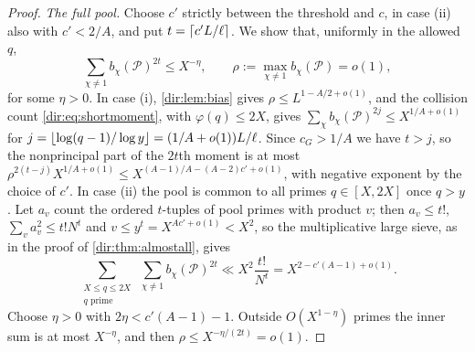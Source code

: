 \begin{proof}
\emph{The full pool.} Choose $c'$ strictly between the threshold and $c$, in case (ii) also with
$c'<2/A$, and put $t=\lceil c'L/\ell\rceil$. We show that, uniformly in the allowed $q$,
\begin{equation}\label{dir:eq:typicalmoment}
 \sum_{\chi\ne1}b_\chi(\mathcal P)^{2t}\le X^{-\eta},\qquad\rho:=\max_{\chi\ne1}b_\chi(\mathcal P)=o(1),
\end{equation}
for some $\eta>0$. In case (i), \cref{dir:lem:bias} gives $\rho\le L^{1-A/2+o(1)}$, and the collision count
\eqref{dir:eq:shortmoment}, with $\varphi(q)\le2X$, gives $\sum_\chi b_\chi(\mathcal P)^{2j}\le X^{1/A+o(1)}$
for $j=\lfloor\log(q-1)/\log y\rfloor=(1/A+o(1))L/\ell$. Since $c_G>1/A$ we have $t>j$, so the nonprincipal part
of the $2t$th moment is at most $\rho^{2(t-j)}X^{1/A+o(1)}\le X^{(A-1)/A-(A-2)c'+o(1)}$, with negative
exponent by the choice of $c'$. In case (ii) the pool is common to all primes $q\in[X,2X]$ once $q>y$.
Let $a_v$ count the ordered $t$-tuples of pool primes with product $v$; then $a_v\le t!$,
$\sum_va_v^2\le t!N^t$ and $v\le y^t=X^{Ac'+o(1)}<X^2$, so the multiplicative large sieve, as in the
proof of \cref{dir:thm:almostall}, gives
\[
 \sum_{\substack{X\le q\le2X\\ q\text{ prime}}}\ \sum_{\chi\ne1}b_\chi(\mathcal P)^{2t}\ll X^2\frac{t!}{N^t}
 =X^{2-c'(A-1)+o(1)}.
\]
Choose $\eta>0$ with $2\eta<c'(A-1)-1$. Outside $O(X^{1-\eta})$ primes the inner sum is at most
$X^{-\eta}$, and then $\rho\le X^{-\eta/(2t)}=o(1)$.


\end{proof}

